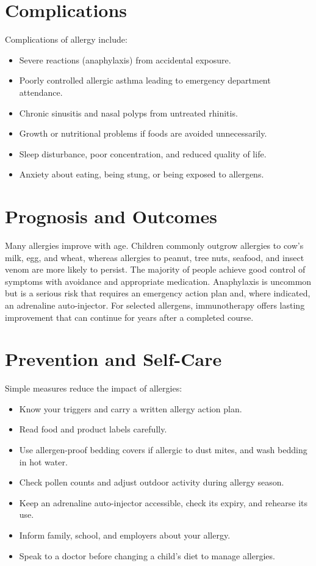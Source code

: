 \section*{Complications}
Complications of allergy include:

\begin{itemize}
    \item Severe reactions (anaphylaxis) from accidental exposure.
    \item Poorly controlled allergic asthma leading to emergency department attendance.
    \item Chronic sinusitis and nasal polyps from untreated rhinitis.
    \item Growth or nutritional problems if foods are avoided unnecessarily.
    \item Sleep disturbance, poor concentration, and reduced quality of life.
    \item Anxiety about eating, being stung, or being exposed to allergens.
\end{itemize}

\section*{Prognosis and Outcomes}
Many allergies improve with age. Children commonly outgrow allergies to cow's milk, egg, and wheat, whereas allergies to peanut, tree nuts, seafood, and insect venom are more likely to persist. The majority of people achieve good control of symptoms with avoidance and appropriate medication. Anaphylaxis is uncommon but is a serious risk that requires an emergency action plan and, where indicated, an adrenaline auto-injector. For selected allergens, immunotherapy offers lasting improvement that can continue for years after a completed course.

\section*{Prevention and Self-Care}
Simple measures reduce the impact of allergies:

\begin{itemize}
    \item Know your triggers and carry a written allergy action plan.
    \item Read food and product labels carefully.
    \item Use allergen-proof bedding covers if allergic to dust mites, and wash bedding in hot water.
    \item Check pollen counts and adjust outdoor activity during allergy season.
    \item Keep an adrenaline auto-injector accessible, check its expiry, and rehearse its use.
    \item Inform family, school, and employers about your allergy.
    \item Speak to a doctor before changing a child's diet to manage allergies.
\end{itemize}

